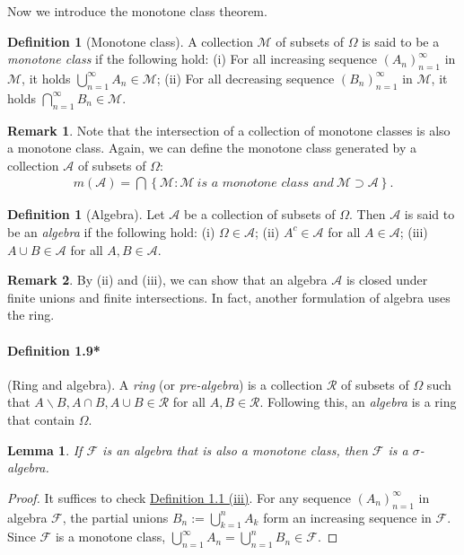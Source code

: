 \documentclass{article}
\numberwithin{equation}{section}
\theoremstyle{plain}
\newtheorem{lemma}[theorem]{Lemma}
\theoremstyle{definition}
\newtheorem{definition}[theorem]{Definition}
\newtheorem*{remark}{Remark}
\begin{document}
Now we introduce the monotone class theorem.

\begin{definition}[Monotone class]\label{def:1.8} A collection $\mathscr{M}$ of subsets of $\Omega$ is said to be a \textit{monotone class} if the following hold: (i) For all increasing sequence $(A_n)_{n=1}^\infty$ in $\mathscr{M}$, it holds $\bigcup_{n=1}^\infty A_n\in\mathscr{M}$; (ii) For all decreasing sequence $(B_n)_{n=1}^\infty$ in $\mathscr{M}$, it holds $\bigcap_{n=1}^\infty B_n\in\mathscr{M}$.
\end{definition}

\begin{remark}
Note that the intersection of a collection of monotone classes is also a monotone class. Again, we can define the monotone class generated by a collection $\mathscr{A}$ of subsets of $\Omega$:
\begin{align*}
	m(\mathscr{A})=\bigcap\left\{\mathscr{M}:\mathscr{M}\ \textit{is a monotone class and}\ \mathscr{M}\supset \mathscr{A}\right\}.
\end{align*}
\end{remark} 

\begin{definition}[Algebra]\label{def:1.9} Let $\mathscr{A}$ be a collection of subsets of $\Omega$. Then $\mathscr{A}$ is said to be an \textit{algebra} if the following hold: (i) $\Omega\in\mathscr{A}$; (ii) $A^c\in \mathscr{A}$ for all $A\in\mathscr{A}$; (iii) $A\cup B\in\mathscr{A}$ for all $A,B\in\mathscr{A}$.
\end{definition}

\begin{remark}
By (ii) and (iii), we can show that an algebra $\mathscr{A}$ is closed under finite unions and finite intersections. In fact, another formulation of algebra uses the ring.
\end{remark}

\paragraph{Definition 1.9*\label{def:1.9*}} (Ring and algebra). A \textit{ring} (or \textit{pre-algebra}) is a collection $\mathscr{R}$ of subsets of $\Omega$ such that $A\backslash B,A\cap B,A\cup B\in\mathscr{R}$ for all $A,B\in\mathscr{R}$. Following this, an \textit{algebra} is a ring that contain $\Omega$. 

\begin{lemma}\label{lemma:1.10} If $\mathscr{F}$ is an algebra that is also a monotone class, then $\mathscr{F}$ is a $\sigma$-algebra.
\end{lemma}
\begin{proof}
It suffices to check \hyperref[def:1.1]{Definition 1.1 (iii)}. For any sequence $(A_n)_{n=1}^\infty$ in algebra $\mathscr{F}$, the partial unions $B_n:=\bigcup_{k=1}^n A_k$ form an increasing sequence in $\mathscr{F}$. Since $\mathscr{F}$ is a monotone class,
$\bigcup_{n=1}^\infty A_n = \bigcup_{n=1}^n B_n \in \mathscr{F}.$
\end{proof}
\end{document}
